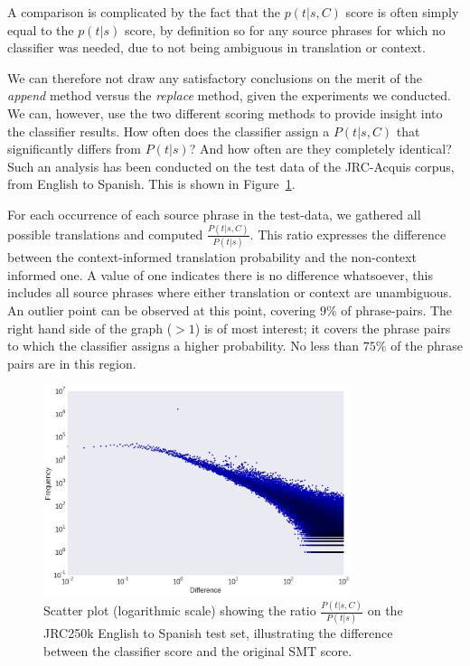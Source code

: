 \documentclass[smallextended]{svjour3}       %
\theoremstyle{break}
\begin{document}
A comparison is complicated by the fact that the $p(t|s,C)$ score is often simply
equal to the $p(t|s)$ score, by definition so for any source phrases for which no
classifier was needed, due to not being ambiguous in translation or context. 

We can therefore not draw any satisfactory conclusions on the merit of the
\emph{append} method versus the \emph{replace} method, given the experiments we
conducted. We can, however, use the two different scoring methods to provide
insight into the classifier results. How often does the classifier assign a
$P(t|s,C)$ that significantly differs from $P(t|s)$? And how often are they
completely identical?  Such an analysis has been conducted on the test data of
the JRC-Acquis corpus, from English to Spanish. This is shown in
Figure~\ref{fig:scoredifference}.

For each occurrence of each source phrase in the test-data, we gathered all
possible translations and computed $\frac{P(t|s,C)}{P(t|s)}$. This ratio
expresses the difference between the context-informed translation probability
and the non-context informed one. A value of one indicates there is no
difference whatsoever, this includes all source phrases where either
translation or context are unambiguous. An outlier point can
be observed at this point, covering $9\%$ of phrase-pairs. The right hand side
of the graph ($>1$) is of most interest; it covers the phrase pairs to which
the classifier assigns a higher probability. No less than $75\%$ of the phrase
pairs are in this region.

\begin{figure}
\begin{center}
\includegraphics[width=90.00mm]{scoredifference.png}
\caption{Scatter plot (logarithmic scale) showing the ratio
$\frac{P(t|s,C)}{P(t|s)}$ on the  JRC250k English to Spanish test set, illustrating the difference between the classifier score and the original SMT score.}
\label{fig:scoredifference}
\end{center}
\end{figure}
\end{document}
